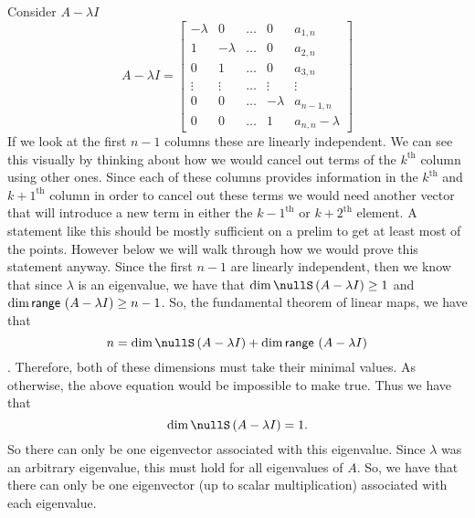 \documentclass[answers]{exam}
\begin{document}
\begin{questions}
\begin{parts}
\begin{solution}
            Consider $A - \lambda I$
            \[
                A-\lambda I = \begin{bmatrix}
                    -\lambda & 0       & \dots & 0       & a_{1,n}  \\
                    1        & -\lambda& \dots & 0       & a_{2,n}  \\
                    0        & 1       & \dots & 0       & a_{3,n}  \\
                    \vdots   & \vdots  & \dots & \vdots  & \vdots   \\
                    0        & 0       & \dots & -\lambda& a_{n-1,n}\\
                    0        & 0       & \dots & 1       & a_{n,n}-\lambda
                \end{bmatrix}
            \]
            If we look at the first $n-1$ columns these are linearly independent. We can see this visually
            by thinking about how we would cancel out terms of the $k^\text{th}$ column using other ones.
            Since each of these columns provides information in the $k^\text{th}$ and $k+1^\text{th}$ column 
            in order to cancel out these terms we would need another vector that will introduce a new term in
            either the $k-1^\text{th}$ or $k+2^\text{th}$ element. A statement like this should be mostly 
            sufficient on a prelim to get at least most of the points. However below we will walk through 
            how we would prove this statement anyway. Since the first $n-1$ are linearly independent, then
            we know that since $\lambda$ is an eigenvalue, we have that 
            $\dim\nullS\left(A-\lambda I\right)\geq 1$ and $\text{dim}\,\mathsf{range}\,\left(A-\lambda I\right)\geq n-1$. So,
            the fundamental theorem of linear maps, we have that 
            $$n = \dim\nullS\left(A-\lambda I\right) + \dim\range\left(A-\lambda I\right)$$. Therefore, 
            both of these dimensions must take their minimal values. As otherwise, the above equation would be
            impossible to make true. Thus we have that
            \[
                \dim\nullS\left(A-\lambda I\right) = 1.
            \]
            So there can only be one eigenvector associated with this eigenvalue. Since $\lambda$ was an arbitrary
            eigenvalue, this must hold for all eigenvalues of $A$. So, we have that there can only be one 
            eigenvector (up to scalar multiplication) associated with each eigenvalue.



\end{solution}
\end{parts}
\end{questions}
\end{document}

